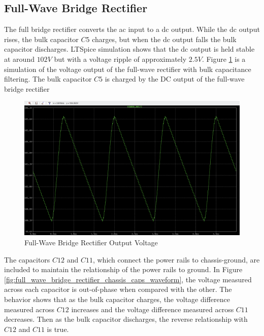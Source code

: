 \documentclass[conference]{IEEEtran}
\begin{document}
\subsection{Full-Wave Bridge Rectifier}
The full bridge rectifier converts the ac input to a dc output. While the dc output rises, the bulk capacitor $C5$ charges, but when the dc output falls the bulk capacitor discharges. LTSpice simulation shows that the dc output is held stable at around $102V$ but with a voltage ripple of approximately $2.5V$. Figure \ref{fig:full_wave_bridge_rectifier_output_waveform} is a simulation of the voltage output of the full-wave rectifier with bulk capacitance filtering. The bulk capacitor $C5$ is charged by the DC output of the full-wave bridge rectifier

\begin{figure}[htp]
    \centering
    \includegraphics[width=1.0\linewidth]{full_wave_bridge_rectifier_output_waveform.png}
    \caption{Full-Wave Bridge Rectifier Output Voltage}
    \label{fig:full_wave_bridge_rectifier_output_waveform}
\end{figure}

The capacitors $C12$ and $C11$, which connect the power rails to chassis-ground, are included to maintain the relationship of the power rails to ground. In Figure \ref{fig:full_wave_bridge_rectifier_chassis_caps_waveform}, the voltage measured across each capacitor is out-of-phase when compared with the other. The behavior shows that as the bulk capacitor charges, the voltage difference measured across $C12$ increases and the voltage difference measured across $C11$ decreases. Then as the bulk capacitor discharges, the reverse relationship with $C12$ and $C11$ is true.
\end{document}
